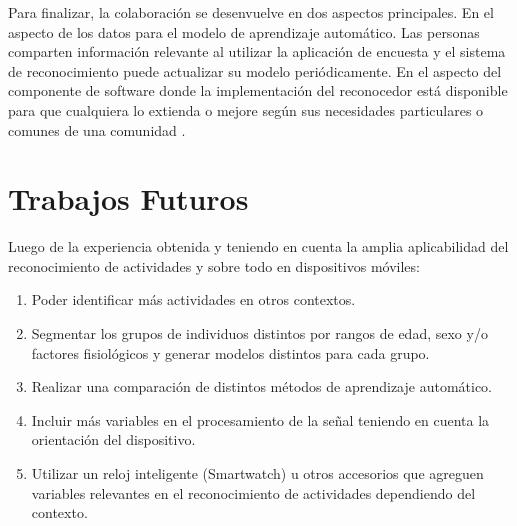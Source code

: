 Para finalizar, la colaboración se desenvuelve en dos aspectos principales.
En el aspecto de los datos para el modelo de aprendizaje automático.
Las personas comparten información relevante al utilizar la aplicación
de encuesta y el sistema de reconocimiento puede actualizar su modelo
periódicamente. En el aspecto del componente de software donde la
implementación del reconocedor está disponible para que cualquiera
lo extienda o mejore según sus necesidades particulares o comunes
de una comunidad \cite{hardroid2016b}.

\section{Trabajos Futuros}

\label{trabajos-futuros}

Luego de la experiencia obtenida y teniendo en cuenta la amplia aplicabilidad
del reconocimiento de actividades y sobre todo en dispositivos móviles:
\begin{enumerate}
\item Poder identificar más actividades en otros contextos. 
\item Segmentar los grupos de individuos distintos por rangos de edad, sexo
y/o factores fisiológicos y generar modelos distintos para cada grupo. 
\item Realizar una comparación de distintos métodos de aprendizaje automático. 
\item Incluir más variables en el procesamiento de la señal teniendo en
cuenta la orientación del dispositivo. 
\item Utilizar un reloj inteligente (Smartwatch) u otros accesorios que
agreguen variables relevantes en el reconocimiento de actividades
dependiendo del contexto. 
\end{enumerate}

